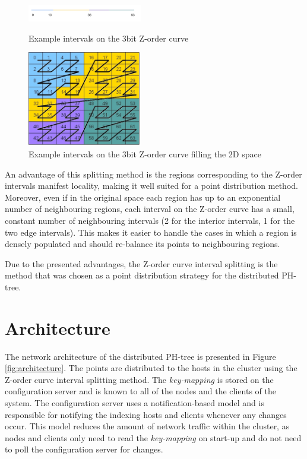 \documentclass[11pt,a4paper]{globis-book}
\begin{document}
\begin{figure}[t]
    \centering
\parbox{5cm}{
    \includegraphics[width=5cm]{images/zorder-line}
    \caption{Example intervals on the 3bit Z-order curve}
    \label{fig:zorder-line}}
\qquad
\begin{minipage}{5cm}
    \includegraphics[width=5cm]{images/zorder-square}
    \caption{Example intervals on the 3bit Z-order curve filling the 2D space}
    \label{fig:zorder-square}
\end{minipage}
\end{figure}

An advantage of this splitting method is the regions corresponding to the Z-order intervals manifest locality, making it well suited for a point distribution method. Moreover, even if in the original space each region has up to an exponential number of neighbouring regions, each interval on the Z-order curve has a small, constant number of neighbouring intervals (2 for the interior intervals, 1 for the two edge intervals). This makes it easier to handle the cases in which a region is densely populated and should re-balance its points to neighbouring regions. 

Due to the presented advantages, the Z-order curve interval splitting is the method that was chosen as a point distribution strategy for the distributed PH-tree. 

\section{Architecture}
\label{sec:distindex-architectures}

The network architecture of the distributed PH-tree is presented in Figure \ref{fig:architecture}. The points are distributed to the hosts in the cluster using the Z-order curve interval splitting method. The \textit{key-mapping} is stored on the configuration server and is known to all of the nodes and the clients of the system. The configuration server uses a notification-based model and is responsible for notifying the indexing hosts and clients whenever any changes occur. This model reduces the amount of network traffic within the cluster, as nodes and clients only need to read the \textit{key-mapping} on start-up and do not need to poll the configuration server for changes. 
\end{document}
